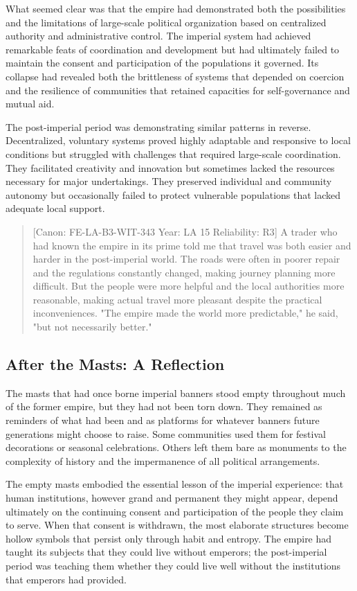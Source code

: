 What seemed clear was that the empire had demonstrated both the
possibilities and the limitations of large-scale political organization
based on centralized authority and administrative control. The imperial
system had achieved remarkable feats of coordination and development but
had ultimately failed to maintain the consent and participation of the
populations it governed. Its collapse had revealed both the brittleness
of systems that depended on coercion and the resilience of communities
that retained capacities for self-governance and mutual aid.

The post-imperial period was demonstrating similar patterns in reverse.
Decentralized, voluntary systems proved highly adaptable and responsive
to local conditions but struggled with challenges that required
large-scale coordination. They facilitated creativity and innovation but
sometimes lacked the resources necessary for major undertakings. They
preserved individual and community autonomy but occasionally failed to
protect vulnerable populations that lacked adequate local support.

\begin{quote}
{[}Canon: FE-LA-B3-WIT-343 \textbar{} Year: LA 15 \textbar{}
Reliability: R3{]} A trader who had known the empire in its prime told
me that travel was both easier and harder in the post-imperial world.
The roads were often in poorer repair and the regulations constantly
changed, making journey planning more difficult. But the people were
more helpful and the local authorities more reasonable, making actual
travel more pleasant despite the practical inconveniences. "The empire
made the world more predictable," he said, "but not necessarily better."
\end{quote}

\subsection{After the Masts: A
Reflection}\label{after-the-masts-a-reflection}

The masts that had once borne imperial banners stood empty throughout
much of the former empire, but they had not been torn down. They
remained as reminders of what had been and as platforms for whatever
banners future generations might choose to raise. Some communities used
them for festival decorations or seasonal celebrations. Others left them
bare as monuments to the complexity of history and the impermanence of
all political arrangements.

The empty masts embodied the essential lesson of the imperial
experience: that human institutions, however grand and permanent they
might appear, depend ultimately on the continuing consent and
participation of the people they claim to serve. When that consent is
withdrawn, the most elaborate structures become hollow symbols that
persist only through habit and entropy. The empire had taught its
subjects that they could live without emperors; the post-imperial period
was teaching them whether they could live well without the institutions
that emperors had provided.

